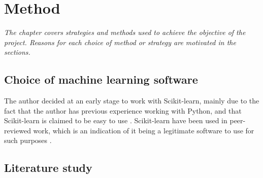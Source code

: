 \chapter{Method}
\emph{The chapter covers strategies and methods used to achieve the objective of the project. Reasons for each choice of method or strategy are motivated in the sections.}




\section{Choice of machine learning software}
	The author decided at an early stage to work with Scikit-learn, mainly due to the fact that the author has previous experience working with Python, and that Scikit-learn is claimed to be easy to use \cite{WEBSITE:27}. Scikit-learn have been used in peer-reviewed work, which is an indication of it being a legitimate software to use for such purposes \cite{ARTICLE:26, ARTICLE:27}.  

\section{Literature study} \label{sec:literature_study}

